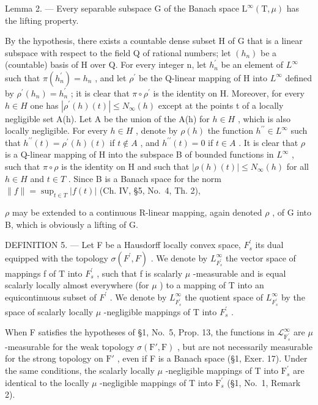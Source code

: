 Lemma 2. --- Every separable subspace G of the Banach space \(\mathrm{L}^{\infty}(\mathrm{T},\mu)\) has the lifting property.

By the hypothesis, there exists a countable dense subset H of G that is a linear subspace with respect to the field Q of rational numbers; let \((h_{n})\) be a (countable) basis of H over Q. For every integer n, let \(h_{n}^{\prime}\) be an element of \(L^{\infty}\) such that \(\pi(h_{n}^{\prime}) = h_{n}\) , and let \(\rho^{\prime}\) be the Q-linear mapping of H into \(L^{\infty}\) defined by \(\rho^{\prime}(h_{n}) = h_{n}^{\prime}\) ; it is clear that \(\pi \circ \rho^{\prime}\) is the identity on H. Moreover, for every \(h \in H\) one has \(|\rho^{\prime}(h)(t)| \leqslant N_{\infty}(h)\) except at the points t of a locally negligible set A(h). Let A be the union of the A(h) for \(h \in H\) , which is also locally negligible. For every \(h \in H\) , denote by \(\rho(h)\) the function \(h^{\prime\prime} \in L^{\infty}\) such that \(h^{\prime\prime}(t) = \rho^{\prime}(h)(t)\) if \(t \notin A\) , and \(h^{\prime\prime}(t) = 0\) if \(t \in A\) . It is clear that \(\rho\) is a Q-linear mapping of H into the subspace B of bounded functions in \(L^{\infty}\) , such that \(\pi \circ \rho\) is the identity on H and such that \(|\rho(h)(t)| \leqslant N_{\infty}(h)\) for all \(h \in H\) and \(t \in T\) . Since B is a Banach space for the norm \(\|f\| = \sup_{t \in T} |f(t)|\) (Ch. IV, §5, No.~4, Th. 2),

\(\rho\) may be extended to a continuous R-linear mapping, again denoted \(\rho\) , of G into B, which is obviously a lifting of G.

DEFINITION 5. --- Let F be a Hausdorff locally convex space, \(F_{s}^{\prime}\) its dual equipped with the topology \(\sigma(F^{\prime},F)\) . We denote by \(L_{F_{s}^{\prime}}^{\infty}\) the vector space of mappings f of T into \(F_{s}^{\prime}\) , such that f is scalarly \(\mu\) -measurable and is equal scalarly locally almost everywhere (for \(\mu\) ) to a mapping of T into an equicontinuous subset of \(F^{\prime}\) . We denote by \(L_{F_{s}^{\prime}}^{\infty}\) the quotient space of \(L_{F_{s}^{\prime}}^{\infty}\) by the space of scalarly locally \(\mu\) -negligible mappings of T into \(F_{s}^{\prime}\) .

When F satisfies the hypotheses of §1, No.~5, Prop. 13, the functions in \(\mathcal{L}_{\mathrm{F}_s^\prime}^\infty\) are \(\mu\) -measurable for the weak topology \(\sigma(\mathrm{F}',\mathrm{F})\) , but are not necessarily measurable for the strong topology on \(\mathrm{F}'\) , even if F is a Banach space (§1, Exer. 17). Under the same conditions, the scalarly locally \(\mu\) -negligible mappings of T into \(\mathrm{F}_s^\prime\) are identical to the locally \(\mu\) -negligible mappings of T into \(\mathrm{F}_s^\prime\) (§1, No.~1, Remark 2).

